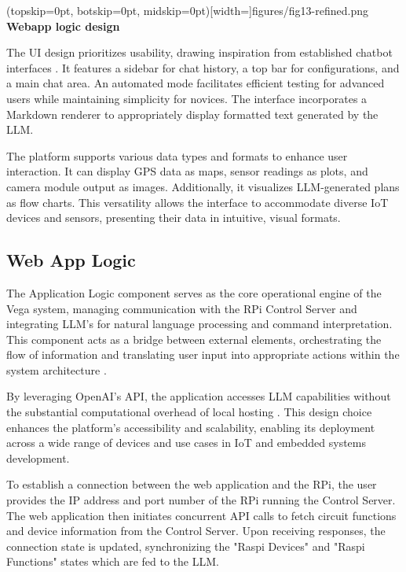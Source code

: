 \documentclass{ieeeaccess}
\begin{document}
\Figure[t!](topskip=0pt, botskip=0pt,
midskip=0pt)[width=\textwidth]{{figures/fig13-refined.png}}
{ \textbf{Webapp logic design}\label{fig5}}


The UI design prioritizes usability, drawing inspiration from established chatbot interfaces \cite{OpenAI_GPT}. It features a sidebar for chat history, a top bar for configurations, and a main chat area. An automated mode facilitates efficient testing for advanced users while maintaining simplicity for novices. The interface incorporates a Markdown renderer to appropriately display formatted text generated by the LLM.


The platform supports various data types and formats to enhance user interaction. It can display GPS data as maps, sensor readings as plots, and camera module output as images. Additionally, it visualizes LLM-generated plans as flow charts. This versatility allows the interface to accommodate diverse IoT devices and sensors, presenting their data in intuitive, visual formats.


\subsection{Web App Logic}
The Application Logic component serves as the core operational engine of the Vega system, managing communication with the RPi Control Server and integrating LLM's for natural language processing and command interpretation. This component acts as a bridge between external elements, orchestrating the flow of information and translating user input into appropriate actions within the system architecture \cite{taylor2010software}.

By leveraging OpenAI's API, the application accesses LLM capabilities without the substantial computational overhead of local hosting \cite{kim2024llmemestimatinggpumemory}. This design choice enhances the platform's accessibility and scalability, enabling its deployment across a wide range of devices and use cases in IoT and embedded systems development.

To establish a connection between the web application and the RPi, the user provides the IP address and port number of the RPi running the Control Server. The web application then initiates concurrent API calls to fetch circuit functions and device information from the Control Server. Upon receiving responses, the connection state is updated, synchronizing the "Raspi Devices" and "Raspi Functions" states which are fed to the LLM.
\end{document}
